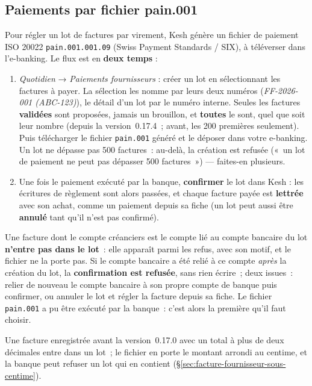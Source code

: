 \documentclass[a4paper,11pt,oneside]{article}
\begin{document}
\subsection{Paiements par fichier pain.001}
\label{sec:paiements-fournisseurs}

Pour régler un lot de factures par virement, Kesh génère un fichier de paiement
ISO 20022 \texttt{pain.001.001.09} (Swiss Payment Standards / SIX), à téléverser
dans l'e-banking. Le flux est en \textbf{deux temps} :

\begin{enumerate}
    \item \emph{Quotidien} → \emph{Paiements fournisseurs} : créer un lot en
    sélectionnant les factures à payer. La sélection les nomme par leurs deux numéros
    (\emph{FF-2026-001 (ABC-123)}), le détail d'un lot par le numéro interne. Seules les
    factures \textbf{validées} sont proposées, jamais un brouillon, et \textbf{toutes} le
    sont, quel que soit leur nombre (depuis la version~0.17.4~; avant, les 200 premières
    seulement). Puis télécharger le fichier
    \texttt{pain.001} généré et le déposer dans votre e-banking. Un lot ne dépasse pas
    500 factures~: au-delà, la création est refusée («~un lot de paiement ne peut pas dépasser
    500 factures~») --- faites-en plusieurs.
    \item Une fois le paiement exécuté par la banque, \textbf{confirmer} le lot
    dans Kesh : les écritures de règlement sont alors passées, et chaque facture
    payée est \textbf{lettrée} avec son achat, comme un paiement depuis sa fiche
    (un lot peut aussi être \textbf{annulé} tant qu'il n'est pas confirmé).
\end{enumerate}

Une facture dont le compte créanciers est le compte lié au compte bancaire du lot
\textbf{n'entre pas dans le lot}~: elle apparaît parmi les refus, avec son motif, et le fichier
ne la porte pas. Si le compte bancaire a été relié à ce compte \emph{après} la création du lot,
la \textbf{confirmation est refusée}, sans rien écrire~; deux issues~: relier de nouveau le compte
bancaire à son propre compte de banque puis confirmer, ou annuler le lot et régler la facture
depuis sa fiche. Le fichier \texttt{pain.001} a pu être exécuté par la banque~: c'est alors la
première qu'il faut choisir.

Une facture enregistrée avant la version~0.17.0 avec un total à plus de deux décimales
entre dans un lot~; le fichier en porte le montant arrondi au centime, et la banque peut refuser
un lot qui en contient (\S\ref{sec:facture-fournisseur-sous-centime}).
\end{document}
